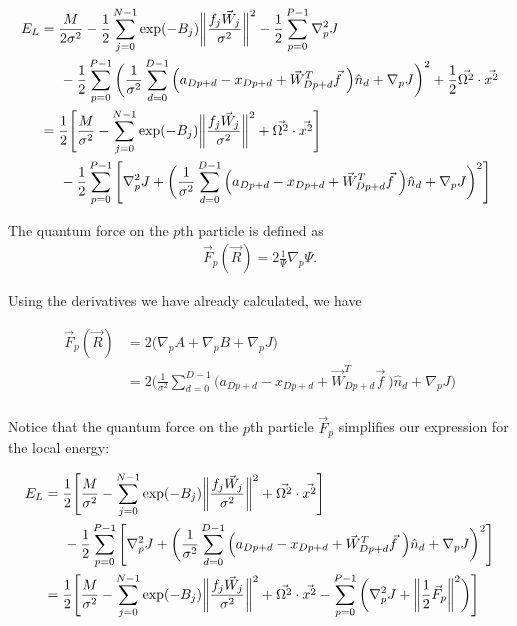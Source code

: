 \documentclass[12pt]{article}
\begin{document}
\begin{align*}
E_L &= \frac{M}{2\sigma^2} - \frac{1}{2} \sum_{j=0}^{N-1} \exp(-B_j) \bigg\| \frac{f_j \vec{W}_j}{\sigma^2} \bigg\|^2 - \frac{1}{2} \sum_{p=0}^{P-1} \nabla_p^2  J\\
& \hspace*{5 mm} -\frac{1}{2} \sum_{p=0}^{P-1} \bigg( \frac{1}{\sigma^2} \sum_{d=0}^{D-1} \Big( a_{Dp+d}-x_{Dp+d} + \vec{W}_{Dp+d}^T \vec{f} \  \Big) \hat{n}_d
 + \nabla_p  J \bigg)^2 + \frac{1}{2} \vec{\Omega^2} \cdot \vec{x^2}\\
&= \frac{1}{2} \Bigg[ \frac{M}{\sigma^2} - \sum_{j=0}^{N-1} \exp(-B_j) \bigg\| \frac{f_j \vec{W}_j}{\sigma^2} \bigg\|^2 + \vec{\Omega^2} \cdot \vec{x^2} \Bigg]\\
& \hspace*{5 mm} - \frac{1}{2} \sum_{p=0}^{P-1} \Bigg[  \nabla_p^2  J +\bigg( \frac{1}{\sigma^2} \sum_{d=0}^{D-1} \Big( a_{Dp+d}-x_{Dp+d} + \vec{W}_{Dp+d}^T \vec{f} \  \Big) \hat{n}_d
 + \nabla_p  J \bigg)^2 \Bigg] \\
\end{align*}

\noindent The quantum force on the $p$th particle is defined as 
\begin{align*}
\vec{F}_p(\vec{R}) = 2 \frac{1}{\Psi} \nabla_p \Psi.
\end{align*}

\noindent Using the derivatives we have already calculated, we have

\begin{align*}
\vec{F}_p(\vec{R}) &= 2 \Big( \nabla_p A + \nabla_p B +\nabla_p J \Big)\\
&= 2\bigg( \frac{1}{\sigma^2} \sum_{d=0}^{D-1} \Big( a_{Dp+d}-x_{Dp+d} + \vec{W}_{Dp+d}^T \vec{f} \  \Big) \hat{n}_d
 + \nabla_p  J \bigg)\\
\end{align*}

\noindent Notice that the quantum force on the $p$th particle $\vec{F}_p$ simplifies our expression for the local energy:

\begin{align*}
E_L &= \frac{1}{2} \Bigg[ \frac{M}{\sigma^2} - \sum_{j=0}^{N-1} \exp(-B_j) \bigg\| \frac{f_j \vec{W}_j}{\sigma^2} \bigg\|^2 + \vec{\Omega^2} \cdot \vec{x^2} \Bigg]\\
& \hspace*{5 mm} - \frac{1}{2} \sum_{p=0}^{P-1} \Bigg[  \nabla_p^2  J +\bigg( \frac{1}{\sigma^2} \sum_{d=0}^{D-1} \Big( a_{Dp+d}-x_{Dp+d} + \vec{W}_{Dp+d}^T \vec{f} \  \Big) \hat{n}_d
 + \nabla_p  J \bigg)^2 \Bigg] \\
 &= \frac{1}{2} \Bigg[ \frac{M}{\sigma^2} - \sum_{j=0}^{N-1} \exp(-B_j) \bigg\| \frac{f_j \vec{W}_j}{\sigma^2} \bigg\|^2 + \vec{\Omega^2} \cdot \vec{x^2} - \sum_{p=0}^{P-1} \bigg(  \nabla_p^2  J + \bigg\|\frac{1}{2} \vec{F}_p \bigg\|^2 \bigg) \Bigg] \\
\end{align*}
\end{document}
